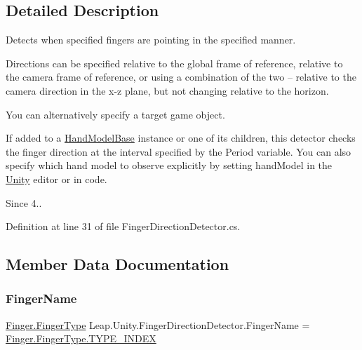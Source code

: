 \subsection{Detailed Description}
Detects when specified fingers are pointing in the specified manner.

Directions can be specified relative to the global frame of reference, relative to the camera frame of reference, or using a combination of the two -- relative to the camera direction in the x-\/z plane, but not changing relative to the horizon.

You can alternatively specify a target game object.

If added to a \mbox{\hyperlink{class_leap_1_1_unity_1_1_hand_model_base}{Hand\+Model\+Base}} instance or one of its children, this detector checks the finger direction at the interval specified by the Period variable. You can also specify which hand model to observe explicitly by setting hand\+Model in the \mbox{\hyperlink{namespace_leap_1_1_unity}{Unity}} editor or in code.

\begin{DoxySince}{Since}
4.. 
\end{DoxySince}


Definition at line 31 of file Finger\+Direction\+Detector.\+cs.



\subsection{Member Data Documentation}
\mbox{\label{class_leap_1_1_unity_1_1_finger_direction_detector_a73b21690811ff68505ea419bf1270d1f}} 
\subsubsection{\texorpdfstring{FingerName}{FingerName}}
{\footnotesize\ttfamily \mbox{\hyperlink{class_leap_1_1_finger_ae75e8d46a01aff0bd5c6d6fb99e2f2ba}{Finger.\+Finger\+Type}} Leap.\+Unity.\+Finger\+Direction\+Detector.\+Finger\+Name = \mbox{\hyperlink{class_leap_1_1_finger_ae75e8d46a01aff0bd5c6d6fb99e2f2baae935a2bcf041187b5d3530f6084c5914}{Finger.\+Finger\+Type.\+T\+Y\+P\+E\+\_\+\+I\+N\+D\+EX}}}

